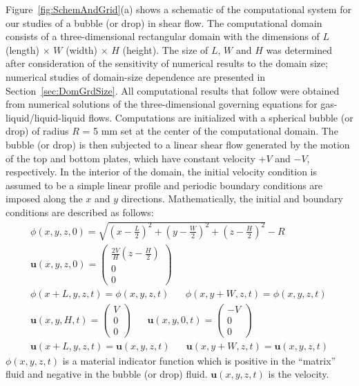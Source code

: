 \documentclass{elsarticle}
\newcommand{\vv}{\mathbf}
\newcommand{\bmu}{\vv{u}}
\begin{document}
Figure~\ref{fig:SchemAndGrid}(a) shows a schematic of the computational system for our studies of a bubble (or drop) in shear flow.  The computational domain consists of a three-dimensional rectangular domain with the dimensions of $L$ (length) $\times$ $W$ (width) $\times$ $H$ (height).  The size of $L$, $W$ and $H$ was determined after consideration of the sensitivity of numerical results to the domain size; numerical studies of domain-size dependence are presented in Section~\ref{sec:DomGrdSize}.  All computational results that follow were obtained from numerical solutions of the three-dimensional governing equations for gas-liquid/liquid-liquid flows.  Computations are initialized with a spherical bubble (or drop) of radius $R$ = 5 mm set at the center of the computational domain.   The bubble (or drop) is then subjected to a linear shear flow generated by the motion of the top and bottom plates, which have constant velocity $+V$ and $-V$, respectively.  In the interior of the domain, the initial velocity condition is assumed to be a simple linear profile and periodic boundary conditions are imposed along the $x$ and $y$ directions.  Mathematically, the initial and boundary conditions are described as follows: 
%
\begin{eqnarray}
	\phi(x,y,z,0)=\sqrt{(x-\frac{L}{2})^{2}+(y-\frac{W}{2})^{2}+
	(z-\frac{H}{2})^{2}}-R \label{IC_BC} \\
	\bmu(x,y,z,0)=\left( \begin{array}{c}
		\frac{2V}{H}(z-\frac{H}{2}) \\ 0 \\ 0 
	\end{array} \right) \nonumber \\
	\phi(x+L,y,z,t)=\phi(x,y,z,t) \hspace{20pt}
	\phi(x,y+W,z,t)=\phi(x,y,z,t) \nonumber \\
	\bmu(x,y,H,t)=\left( \begin{array}{c}
		                V \\ 0 \\ 0 
	\end{array} \right)  \hspace{20pt}
	\bmu(x,y,0,t)=\left( \begin{array}{c}
		                -V \\ 0 \\ 0 
	\end{array} \right)  \nonumber \\
	\bmu(x+L,y,z,t)=\bmu(x,y,z,t) \hspace{20pt} 
	\bmu(x,y+W,z,t)=\bmu(x,y,z,t) \nonumber
\end{eqnarray}
%
$\phi(x,y,z,t)$ is a material indicator function which is positive in the
``matrix'' fluid and negative in the bubble (or drop) fluid.  $\bmu(x,y,z,t)$
is the velocity.
\end{document}
